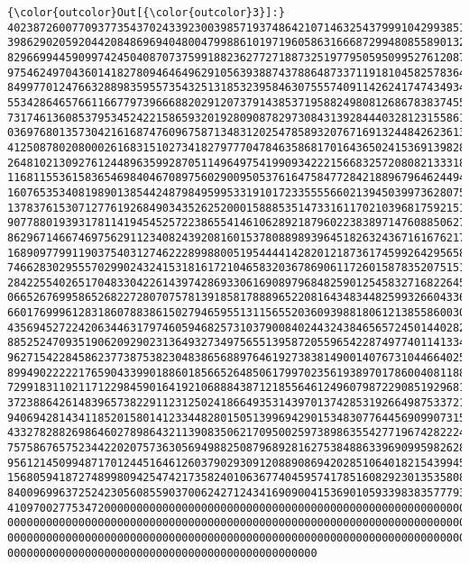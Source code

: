 \begin{Verbatim}[commandchars=\\\{\}]
{\color{outcolor}Out[{\color{outcolor}3}]:}
402387260077093773543702433923003985719374864210714632543799910429938512
398629020592044208486969404800479988610197196058631666872994808558901323
829669944590997424504087073759918823627727188732519779505950995276120874
975462497043601418278094646496291056393887437886487337119181045825783647
849977012476632889835955735432513185323958463075557409114262417474349347
553428646576611667797396668820291207379143853719588249808126867838374559
731746136085379534524221586593201928090878297308431392844403281231558611
036976801357304216168747609675871348312025478589320767169132448426236131
412508780208000261683151027341827977704784635868170164365024153691398281
264810213092761244896359928705114964975419909342221566832572080821333186
116811553615836546984046708975602900950537616475847728421889679646244945
160765353408198901385442487984959953319101723355556602139450399736280750
137837615307127761926849034352625200015888535147331611702103968175921510
907788019393178114194545257223865541461062892187960223838971476088506276
862967146674697562911234082439208160153780889893964518263243671616762179
168909779911903754031274622289988005195444414282012187361745992642956581
746628302955570299024324153181617210465832036786906117260158783520751516
284225540265170483304226143974286933061690897968482590125458327168226458
066526769958652682272807075781391858178889652208164348344825993266043367
660176999612831860788386150279465955131156552036093988180612138558600301
435694527224206344631797460594682573103790084024432438465657245014402821
885252470935190620929023136493273497565513958720559654228749774011413346
962715422845862377387538230483865688976461927383814900140767310446640259
899490222221765904339901886018566526485061799702356193897017860040811889
729918311021171229845901641921068884387121855646124960798722908519296819
372388642614839657382291123125024186649353143970137428531926649875337218
940694281434118520158014123344828015051399694290153483077644569099073152
433278288269864602789864321139083506217095002597389863554277196742822248
757586765752344220207573630569498825087968928162753848863396909959826280
956121450994871701244516461260379029309120889086942028510640182154399457
156805941872748998094254742173582401063677404595741785160829230135358081
840096996372524230560855903700624271243416909004153690105933983835777939
410970027753472000000000000000000000000000000000000000000000000000000000
000000000000000000000000000000000000000000000000000000000000000000000000
000000000000000000000000000000000000000000000000000000000000000000000000
000000000000000000000000000000000000000000000000
\end{Verbatim}
            
